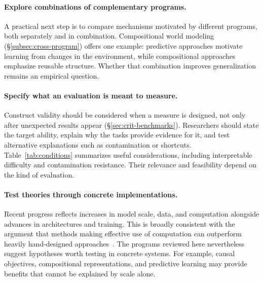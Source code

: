 \documentclass[acmsmall,screen,review,anonymous]{acmart}
\begin{document}
\paragraph{Explore combinations of complementary programs.}
A practical next step is to compare mechanisms motivated by different programs, both separately and in combination.
%
Compositional world modeling (\S\ref{subsec:cross-program}) offers one example: predictive approaches motivate learning from changes in the environment, while compositional approaches emphasize reusable structure.
%
Whether that combination improves generalization remains an empirical question.

\paragraph{Specify what an evaluation is meant to measure.}
Construct validity should be considered when a measure is designed, not only after unexpected results appear (\S\ref{sec:crit-benchmarks}).
%
Researchers should state the target ability, explain why the tasks provide evidence for it, and test alternative explanations such as contamination or shortcuts.
%
Table~\ref{tab:conditions} summarizes useful considerations, including interpretable difficulty and contamination resistance.
%
Their relevance and feasibility depend on the kind of evaluation.

\paragraph{Test theories through concrete implementations.}
Recent progress reflects increases in model scale, data, and computation alongside advances in architectures and training.
%
This is broadly consistent with the argument that methods making effective use of computation can outperform heavily hand-designed approaches~\citep{sutton2019bitter}.
%
The programs reviewed here nevertheless suggest hypotheses worth testing in concrete systems.
%
For example, causal objectives, compositional representations, and predictive learning may provide benefits that cannot be explained by scale alone.





\end{document}
